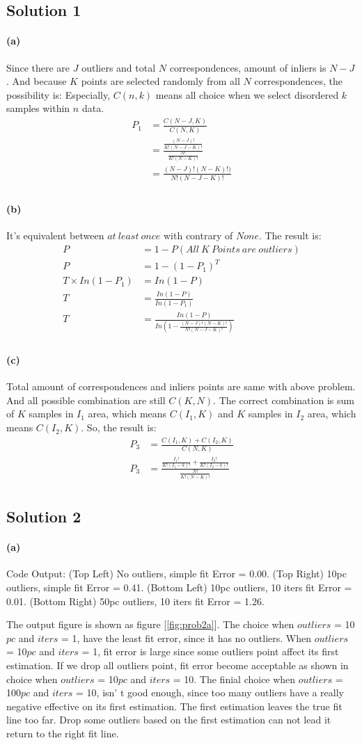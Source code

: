 \documentclass{article}
\newcommand{\solution}[1]{\clearpage \subsection*{Solution #1}}
\newcommand{\spart}[1]{\paragraph{(#1)}}
\begin{document}

\solution{1}
\spart{a}
Since there are $J$ outliers and total $N$ correspondences, amount of inliers is $N-J$.
And because $K$ points are selected randomly from all $N$ correspondences, the possibility is:
Especially, $C(n, k)$ means all choice when we select disordered $k$ samples within $n$ data.
$$
  \begin{aligned}
    P_1 & = \frac{C(N-J, K)}{C(N, K)} \\
    & = \frac{\frac{(N-J)!}{K!(N-J-K)!}}{\frac{N!}{K!(N-K)!}} \\
    & = \frac{(N-J)!(N-K)!)}{N!(N-J-K)!} \\
  \end{aligned}
$$

\spart{b}
It's equivalent between $at\ least\ once$ with contrary of $None$. The result is:
$$
  \begin{aligned}
    P & = 1 - P(All\ K\ Points\ are\ outliers) \\
    P & =  1 - {(1 - P_1)}^T \\
    T\times In(1 - P_1) & = In(1-P) \\
    T & = \frac{In(1-P)}{In(1-P_1)} \\
    T & = \frac{In(1-P)}{In(1-\frac{(N-J)!(N-K)!}{N!(N-J-K)!})} \\
  \end{aligned}
$$ 
\spart{c}
Total amount of correspondences and inliers points are same with above problem. And all possible combination are still $C(K, N)$.
The correct combination is sum of $K$ samples in $I_1$ area, which means $C(I_1, K)$ and $K$ samples in $I_2$ area, which means $C(I_2, K)$. So, the result is:
$$
  \begin{aligned}
    P_3 & = \frac{C(I_1, K) + C(I_2, K)}{C(N, K)} \\
    P_3 & = \frac{\frac{I_1!}{K!(I_1-k)!} + \frac{I_2!}{K!(I_2-k)!}}{\frac{N!}{K!(N-K)!}} \\
  \end{aligned}
$$

\solution{2} 
\spart{a}
Code Output:
(Top Left) No outliers, simple fit Error = 0.00. 
(Top Right) 10pc outliers, simple fit Error = 0.41. 
(Bottom Left) 10pc outliers, 10 iters fit Error = 0.01. 
(Bottom Right) 50pc outliers, 10 iters fit Error = 1.26. 

The output figure is shown as figure [\ref{fig:prob2a}]. 
The choice when $outliers$ = 10$pc$ and $iters$ = 1, have the least fit error, since it has no outliers.
When $outliers$ = 10$pc$ and $iters$ = 1, fit error is large since some outliers point affect its first estimation.
If we drop all outliers point, fit error become acceptable as shown in choice when $outliers$ = 10$pc$ and $iters$ = 10.
The finial choice when $outliers$ = 100$pc$ and $iters$ = 10, isn' t good enough, since too many outliers have a really negative effective on its first estimation.
The first estimation leaves the true fit line too far. Drop some outliers based on the first estimation can not lead it return to the right fit line.
\end{document}
